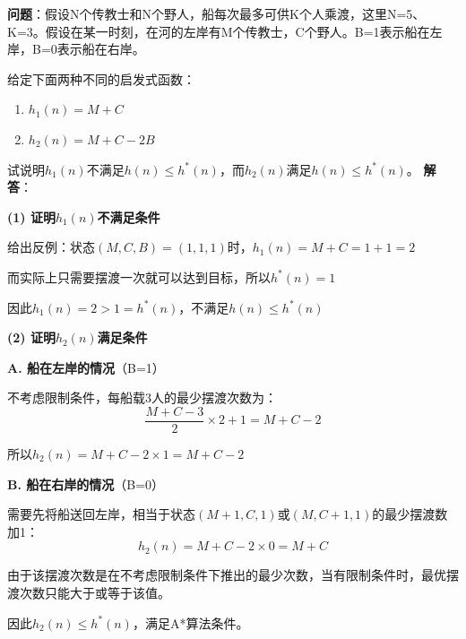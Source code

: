 \begin{examplebox}[例题4.8 传教士与野人问题]
\textbf{问题}：假设N个传教士和N个野人，船每次最多可供K个人乘渡，这里N=5、K=3。假设在某一时刻，在河的左岸有M个传教士，C个野人。B=1表示船在左岸，B=0表示船在右岸。

给定下面两种不同的启发式函数：
\begin{enumerate}[itemsep=0pt]
    \item $h_1(n) = M + C$
    \item $h_2(n) = M + C - 2B$
\end{enumerate}

试说明$h_1(n)$不满足$h(n) \leq h^*(n)$，而$h_2(n)$满足$h(n) \leq h^*(n)$。
\tcblower
\textbf{解答}：

\textbf{(1) 证明$h_1(n)$不满足条件}

给出反例：状态$(M,C,B) = (1,1,1)$时，$h_1(n) = M + C = 1 + 1 = 2$

而实际上只需要摆渡一次就可以达到目标，所以$h^*(n) = 1$

因此$h_1(n) = 2 > 1 = h^*(n)$，不满足$h(n) \leq h^*(n)$

\textbf{(2) 证明$h_2(n)$满足条件}

\textbf{A. 船在左岸的情况}（B=1）

不考虑限制条件，每船载3人的最少摆渡次数为：
$$\frac{M+C-3}{2} \times 2 + 1 = M + C - 2$$

所以$h_2(n) = M + C - 2 \times 1 = M + C - 2$

\textbf{B. 船在右岸的情况}（B=0）

需要先将船送回左岸，相当于状态$(M+1, C, 1)$或$(M, C+1, 1)$的最少摆渡数加1：
$$h_2(n) = M + C - 2 \times 0 = M + C$$

由于该摆渡次数是在不考虑限制条件下推出的最少次数，当有限制条件时，最优摆渡次数只能大于或等于该值。

因此$h_2(n) \leq h^*(n)$，满足A*算法条件。
\end{examplebox}
